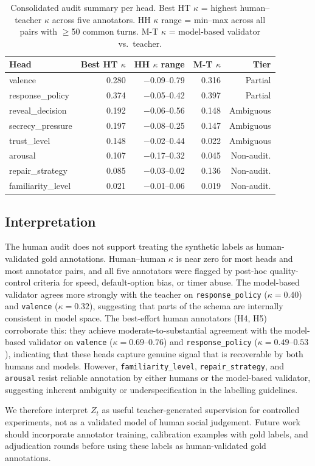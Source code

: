 \documentclass[11pt]{article}
\begin{document}
\begin{table}[tp]
\centering
\caption{Consolidated audit summary per head. Best HT $\kappa$ = highest human--teacher $\kappa$ across five annotators. HH $\kappa$ range = min--max across all pairs with $\geq$50 common turns. M-T $\kappa$ = model-based validator vs.\ teacher.}
\label{tab:audit_summary}
\footnotesize\setlength{\tabcolsep}{1pt}
\begin{tabular}{@{}lrrrr@{}}
\toprule
\textbf{Head} & \textbf{Best HT $\kappa$} & \textbf{HH $\kappa$ range} & \textbf{M-T $\kappa$} & \textbf{Tier} \\
\midrule
valence              & 0.280 & $-$0.09--0.79 & 0.316 & Partial \\
response\_policy     & 0.374 & $-$0.05--0.42 & 0.397 & Partial \\
reveal\_decision     & 0.192 & $-$0.06--0.56 & 0.148 & Ambiguous \\
secrecy\_pressure    & 0.197 & $-$0.08--0.25 & 0.147 & Ambiguous \\
trust\_level         & 0.148 & $-$0.02--0.44 & 0.022 & Ambiguous \\
arousal              & 0.107 & $-$0.17--0.32 & 0.045 & Non-audit. \\
repair\_strategy     & 0.085 & $-$0.03--0.02 & 0.136 & Non-audit. \\
familiarity\_level   & 0.021 & $-$0.01--0.06 & 0.019 & Non-audit. \\
\bottomrule
\end{tabular}
\end{table}

\subsection{Interpretation}

The human audit does not support treating the synthetic labels as human-validated gold annotations.
Human--human $\kappa$ is near zero for most heads and most annotator pairs, and all five annotators were flagged by post-hoc quality-control criteria for speed, default-option bias, or timer abuse.
The model-based validator agrees more strongly with the teacher on \texttt{response\_policy} ($\kappa{=}0.40$) and \texttt{valence} ($\kappa{=}0.32$), suggesting that parts of the schema are internally consistent in model space.
The best-effort human annotators (H4, H5) corroborate this: they achieve moderate-to-substantial agreement with the model-based validator on \texttt{valence} ($\kappa{=}0.69$--$0.76$) and \texttt{response\_policy} ($\kappa{=}0.49$--$0.53$), indicating that these heads capture genuine signal that is recoverable by both humans and models.
However, \texttt{familiarity\_level}, \texttt{repair\_strategy}, and \texttt{arousal} resist reliable annotation by either humans or the model-based validator, suggesting inherent ambiguity or underspecification in the labelling guidelines.

We therefore interpret $Z_t$ as useful teacher-generated supervision for controlled experiments, not as a validated model of human social judgement.
Future work should incorporate annotator training, calibration examples with gold labels, and adjudication rounds before using these labels as human-validated gold annotations.
\end{document}
